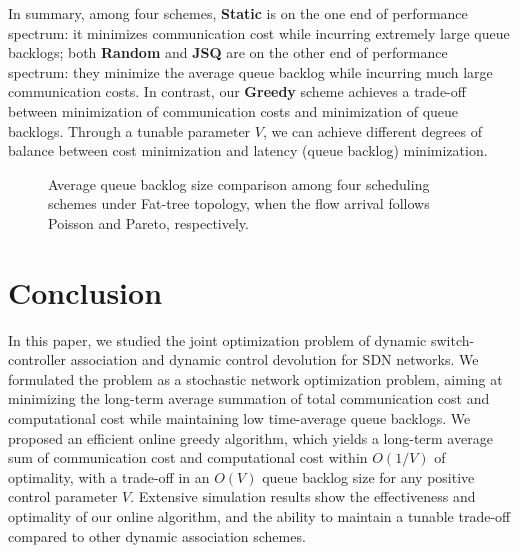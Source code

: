 \documentclass[10pt,journal,compsoc]{IEEEtran}
\begin{document}
In summary, among four schemes, \textbf{Static} is on the one end of performance spectrum: it minimizes communication cost while incurring extremely large queue backlogs; both \textbf{Random} and \textbf{JSQ} are on the other end of performance spectrum: they minimize the average queue backlog while incurring much large communication costs. In contrast, our \textbf{Greedy} scheme achieves a trade-off between minimization of communication costs and minimization of queue backlogs. Through a tunable parameter $V$, we can achieve different degrees of balance between cost minimization and latency (queue backlog) minimization. 

\begin{figure}[!t]
\centering
 \caption{Average queue backlog size comparison among four scheduling schemes under Fat-tree topology, when the flow arrival follows Poisson and Pareto, respectively.}
 \label{qlen}
\end{figure}


\section{Conclusion}

In this paper, we studied the joint optimization problem of dynamic switch-controller association and dynamic control devolution for SDN networks. We formulated the problem as a stochastic network optimization problem, aiming at minimizing the long-term average summation of total communication cost and computational cost while maintaining low time-average queue backlogs. We proposed an efficient online greedy algorithm, which yields a long-term average sum of communication cost and computational cost within $O(1 \slash V)$ of optimality, with a trade-off in an $O(V)$ queue backlog size for any positive control parameter $V$. Extensive simulation results show the effectiveness and optimality of our online algorithm, and the ability to maintain a tunable trade-off compared to other dynamic association schemes. 
\end{document}
